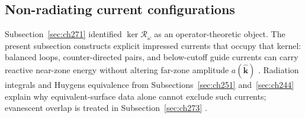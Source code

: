 \subsection{Non-radiating current configurations}
\label{sec:ch272}

Subsection~\ref{sec:ch271} identified $\ker\mathcal{R}_\omega$ as an operator-theoretic object.
The present subsection constructs explicit impressed currents that occupy that kernel: balanced
loops, counter-directed pairs, and below-cutoff guide currents can carry reactive near-zone energy
without altering far-zone amplitude $a(\widehat{\mathbf{k}})$ \cite{devaney2004,stratton1941}.
Radiation integrals and Huygens equivalence from Subsections~\ref{sec:ch251}
and~\ref{sec:ch244} explain why equivalent-surface data alone cannot exclude such currents;
evanescent overlap is treated in Subsection~\ref{sec:ch273} \cite{harrington2001}.

